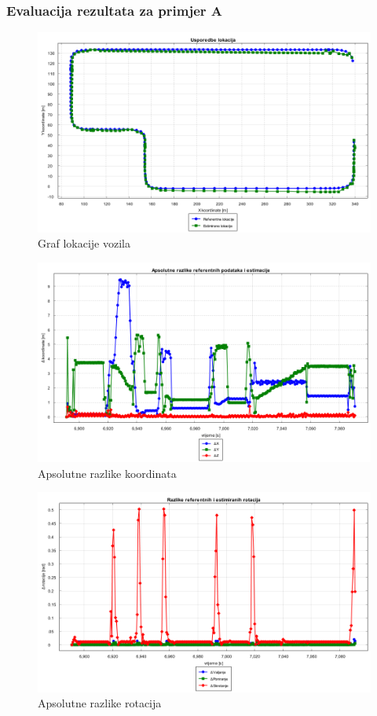 \subsubsection{Evaluacija rezultata za primjer A}
\begin{figure}[H]
  \includegraphics[scale=0.4]{images/algo1/primjer3/usporedba_lokacija.png}
  \caption{Graf lokacije vozila}
  \label{eval:a1p3_lokacija}
\end{figure}
\begin{figure}[H]
  \includegraphics[scale=0.4]{images/algo1/primjer3/apsolutne_razlike_koordinata.png}
  \caption{Apsolutne razlike koordinata}
  \label{eval:a1p3_koord_razlike}
\end{figure}
\begin{figure}[H]
  \includegraphics[scale=0.4]{images/algo1/primjer3/rotacije_razlike.png}
  \caption{Apsolutne razlike rotacija}
  \label{eval:a1p3_rot_razlike}
\end{figure}
